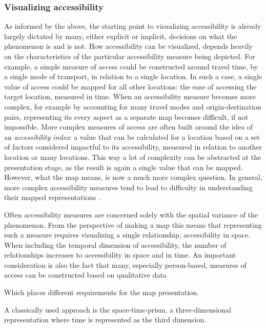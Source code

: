 \subsubsection{Visualizing accessibility}

As informed by the above,
the starting point to visualizing accessibility is already largely dictated by
many, either explicit or implicit, decisions on what the phenomenon is and is not.
How accessibility can be visualized, depends heavily on
the characteristics of the particular accessibility measure being depicted.
For example, a simple measure of access could be constructed around
travel time, by a single mode of transport, in relation to a single location.
In such a case, a single value of access could be mapped
for all other locations:
the ease of accessing the target location, measured in time.
When an accessibility measure becomes more complex,
for example by accounting for many travel modes and origin-destination pairs,
representing its every aspect as a separate map becomes difficult,
if not impossible.
More complex measures of access are often built around the idea of
an \textit{accessibility index}:
a value that can be calculated for a location
based on a set of factors considered impactful to its accessibility,
measured in relation to another location or many locations.
This way a lot of complexity can be abstracted at the presentation stage,
as the result is again a single value that can be mapped.
However, what the map means, is now a much more complex question.
In general, more complex accessibility measures tend to lead to
difficulty in understanding their mapped representations \parencite{te2014}.

Often accessibility measures are concerned solely with
the spatial variance of the phenomenon.
From the perspective of making a map this means that
representing such a measure requires visualizing a single relationship,
accessibility in space.
When including the temporal dimension of accessibility,
the number of relationships increases to
accessibility in space and in time.
An important consideration is also the fact that
many, especially person-based, measures of access can be constructed
based on qualitative data

Which places different requirements for the map presentation.

A classically used approach is the space-time-prism,
a three-dimensional representation where
time is represented as the third dimension.

